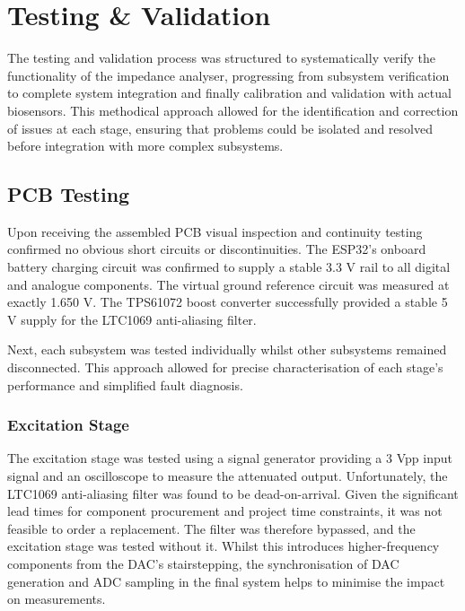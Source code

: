 \graphicspath{{testing_and_validation/fig/}}

\chapter{Testing \& Validation}

The testing and validation process was structured to systematically verify the functionality of the impedance analyser, progressing from subsystem verification to complete system integration and finally calibration and validation with actual biosensors. This methodical approach allowed for the identification and correction of issues at each stage, ensuring that problems could be isolated and resolved before integration with more complex subsystems.


\section{PCB Testing}

Upon receiving the assembled PCB visual inspection and continuity testing confirmed no obvious short circuits or discontinuities. The ESP32's onboard battery charging circuit was confirmed to supply a stable 3.3 V rail to all digital and analogue components. The virtual ground reference circuit was measured at exactly 1.650 V. The TPS61072 boost converter successfully provided a stable 5 V supply for the LTC1069 anti-aliasing filter.

Next, each subsystem was tested individually whilst other subsystems remained disconnected. This approach allowed for precise characterisation of each stage's performance and simplified fault diagnosis.

\subsection{Excitation Stage} 
The excitation stage was tested using a signal generator providing a 3 Vpp input signal and an oscilloscope to measure the attenuated output. Unfortunately, the LTC1069 anti-aliasing filter was found to be dead-on-arrival. Given the significant lead times for component procurement and project time constraints, it was not feasible to order a replacement. The filter was therefore bypassed, and the excitation stage was tested without it. Whilst this introduces higher-frequency components from the DAC's stairstepping, the synchronisation of DAC generation and ADC sampling in the final system helps to minimise the impact on measurements.

